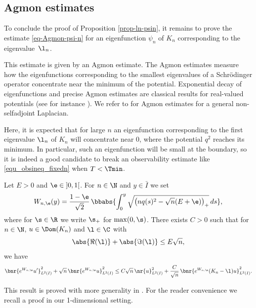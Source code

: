 \subsection{Agmon estimates} \label{sec-Agmon}

To conclude the proof of Proposition \ref{prop-ln-psin}, it remains to prove the estimate \eqref{eq-Agmon-psi-n} for an eigenfunction $\psi_n$ of $K_n$ corresponding to the eigenvalue~$\l_n$.

This estimate is given by an Agmon estimate. The Agmon estimates measure how the eigenfunctions corresponding to the smallest eigenvalues of a Schrödinger operator concentrate near the minimum of the potential. Exponential decay of eigenfunctions and precise Agmon estimates are classical results for real-valued potentials (see for instance \cite{Agmon85,helffer1}). We refer to \cite{KrejcirikRayRoySie17} for Agmon estimates for a general non-selfadjoint Laplacian.

Here, it is expected that for large $n$ an eigenfunction corresponding to the first eigenvalue $\l_n$ of $K_n$ will concentrate near 0, where the potential $q^2$ reaches its minimum. In particular, such an eigenfunction will be small at the boundary, so it is indeed a good candidate to break an observability estimate like \eqref{equ_obsineq_fixedn} when $T < \Tmin$.

\begin{proposition} \label{prop-Agmon}
Let $E > 0$ and $\e \in{}]0,1[$. For $n \in \N$ and $y \in \bar I$ we set
\begin{equation} \label{def-W}
W_{n,\e}(y) = \frac {1-\e} {\sqrt 2}\, \bbabs{\int_0^y \sqrt{\bigl(nq(s)^2 - \sqrt{n}(E + \e) \bigr)_+} \, ds},
\end{equation}
where for $\s \in \R$ we write $\s_+$ for $\max(0,\s)$. There exists $C > 0$ such that for $n \in \N$, $u \in \Dom(K_n)$ and $\l \in \C$ with
\begin{equation} \label{hyp-lambda}
\abs{\Re(\l)} + \abs{\Im(\l)} \leq E \sqrt n,
\end{equation}
we have
\begin{multline*}
\bnr{e^{W_{n,\e}} u'}_{L^2(I)}^2 + \sqrt n\,\bnr{e^{W_{n,\e}} u}_{L^2(I)}^2
\leq C \sqrt n\,\nr{u}_{L^2(I)}^2 +\frac {C}{\sqrt n}\, \bnr{e^{W_{n,\e}} (K_n-\l)u}_{L^2(I)}^2.
\end{multline*}
\end{proposition}

This result is proved with more generality in \cite{KrejcirikRayRoySie17}. For the reader convenience we recall a proof in our 1-dimensional setting.

